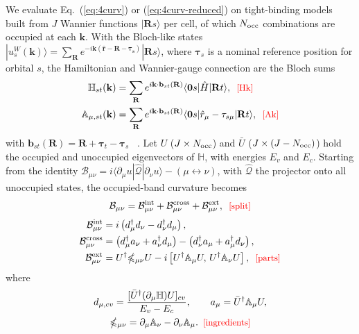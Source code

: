 \documentclass[galley,aps,pra,10pt,amsmath,amssymb,
    superscriptaddress,nofootinbib,longbibliography]{revtex4-2}
\def\Red#1{\textcolor{red}{#1}}
\newcounter{comm}
\newcommand{\eqlab}[1]{\Red{\hbox{\small\;\;[#1]}}\label{eq:#1}}
\newcommand{\eqlab}[1]{\label{eq:#1}}
\newcommand{\nn}{\nonumber\\}
\newcommand{\eqo}[2]{Eq.~(\ref{eq:#1}) or (\ref{eq:#2})}
\newcommand{\BB}{\mathcal{B}}              %
\newcommand{\Ab}{\mathbb{A}}               %
\newcommand{\Hb}{\mathbb{H}}               %
\newcommand{\Omb}{\mathbb{\Omega}}         %
\begin{document}
We evaluate \eqo{4curv}{4curv-reduced} on tight-binding models built from $J$ Wannier functions $|\mathbf{R}s\rangle$ per cell, of which $N_{\rm occ}$ combinations are occupied at each $\mathbf k$. With the Bloch-like states $|u^W_s(\mathbf{k})\rangle = \sum_{\mathbf{R}} e^{-i\mathbf{k}(\hat{\mathbf{r}}- \mathbf{R} - \boldsymbol{\tau_s})} |\mathbf{R} s\rangle$, where $\boldsymbol{\tau}_s$ is a nominal reference position for orbital $s$, the Hamiltonian and Wannier-gauge connection are the Bloch sums
\begin{align}
\Hb_{st}(\mathbf k)&=\sum_{\mathbf R}e^{i\mathbf k\cdot\mathbf b_{st}(\mathbf R)}\langle\mathbf 0s|\hat H|\mathbf Rt\rangle,
\eqlab{Hk}\\
\Ab_{\mu,st}(\mathbf k)&=\sum_{\mathbf R}e^{i\mathbf k\cdot\mathbf b_{st}(\mathbf R)}\langle\mathbf 0s|\hat r_\mu-\tau_{s\mu}|\mathbf Rt\rangle,
\eqlab{Ak}
\end{align}
with $\mathbf b_{st}(\mathbf R)=\mathbf R+\boldsymbol\tau_t-\boldsymbol\tau_s$ ~\cite{wang2006abinitio, yates2007spectral, marzari2012maximally}.
Let $U$ ($J\times N_{\rm occ}$) and $\bar U$ ($J\times(J-N_{\rm occ})$) hold the occupied and unoccupied eigenvectors of $\Hb$, with energies $E_v$ and $E_c$.
Starting from the identity $\BB_{\mu\nu}=i\langle\partial_\mu u|\hat{\mathcal Q}|\partial_\nu u\rangle-(\mu\leftrightarrow\nu)$, with $\hat{\mathcal Q}$ the projector onto all unoccupied states, the occupied-band curvature becomes
\begin{equation}
\BB_{\mu\nu}=\BB^{\rm int}_{\mu\nu}+\BB^{\rm cross}_{\mu\nu}+\BB^{\rm ext}_{\mu\nu},
\eqlab{split}
\end{equation}
\begin{align}
\BB^{\rm int}_{\mu\nu}&=i\left(d^\dagger_\mu d_\nu-d^\dagger_\nu d_\mu\right),\nn
\BB^{\rm cross}_{\mu\nu}&=\left(d^\dagger_\mu a_\nu+a^\dagger_\nu d_\mu\right)-\left(d^\dagger_\nu a_\mu+a^\dagger_\mu d_\nu\right),\nn
\BB^{\rm ext}_{\mu\nu}&=U^\dagger\Omb_{\mu\nu}U-i\left[U^\dagger\Ab_\mu U,\,U^\dagger\Ab_\nu U\right],
\eqlab{parts}
\end{align}
where
\begin{gather}
d_{\mu,cv}=\frac{[\bar U^\dagger(\partial_\mu\Hb)U]_{cv}}{E_v-E_c},\qquad a_\mu=\bar U^\dagger\Ab_\mu U,\nn
\Omb_{\mu\nu}=\partial_\mu\Ab_\nu-\partial_\nu\Ab_\mu.
\eqlab{ingredients}
\end{gather}
\end{document}
